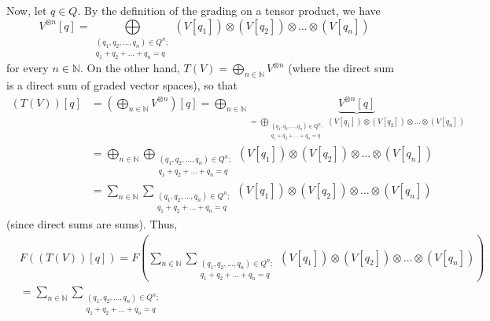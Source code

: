 \documentclass[etingof-lie.tex]{subfiles}
\begin{document}
\begin{verlong}
Now, let $q\in Q$. By the definition of the grading on a tensor product, we
have%
\[
V^{\otimes n}\left[  q\right]  =\bigoplus\limits_{\substack{\left(
q_{1},q_{2},...,q_{n}\right)  \in Q^{n};\\q_{1}+q_{2}+...+q_{n}=q}}\left(
V\left[  q_{1}\right]  \right)  \otimes\left(  V\left[  q_{2}\right]  \right)
\otimes...\otimes\left(  V\left[  q_{n}\right]  \right)
\]
for every $n\in\mathbb{N}$. On the other hand, $T\left(  V\right)
=\bigoplus\limits_{n\in\mathbb{N}}V^{\otimes n}$ (where the direct sum is a
direct sum of graded vector spaces), so that%
\begin{align*}
\left(  T\left(  V\right)  \right)  \left[  q\right]   &  =\left(
\bigoplus\limits_{n\in\mathbb{N}}V^{\otimes n}\right)  \left[  q\right]
=\bigoplus\limits_{n\in\mathbb{N}}\underbrace{V^{\otimes n}\left[  q\right]
}_{=\bigoplus\limits_{\substack{\left(  q_{1},q_{2},...,q_{n}\right)  \in
Q^{n};\\q_{1}+q_{2}+...+q_{n}=q}}\left(  V\left[  q_{1}\right]  \right)
\otimes\left(  V\left[  q_{2}\right]  \right)  \otimes...\otimes\left(
V\left[  q_{n}\right]  \right)  }\\
&  =\bigoplus\limits_{n\in\mathbb{N}}\bigoplus\limits_{\substack{\left(
q_{1},q_{2},...,q_{n}\right)  \in Q^{n};\\q_{1}+q_{2}+...+q_{n}=q}}\left(
V\left[  q_{1}\right]  \right)  \otimes\left(  V\left[  q_{2}\right]  \right)
\otimes...\otimes\left(  V\left[  q_{n}\right]  \right) \\
&  =\sum\limits_{n\in\mathbb{N}}\sum\limits_{\substack{\left(  q_{1}%
,q_{2},...,q_{n}\right)  \in Q^{n};\\q_{1}+q_{2}+...+q_{n}=q}}\left(  V\left[
q_{1}\right]  \right)  \otimes\left(  V\left[  q_{2}\right]  \right)
\otimes...\otimes\left(  V\left[  q_{n}\right]  \right)
\end{align*}
(since direct sums are sums). Thus,%
\begin{align*}
&  F\left(  \left(  T\left(  V\right)  \right)  \left[  q\right]  \right)
=F\left(  \sum\limits_{n\in\mathbb{N}}\sum\limits_{\substack{\left(
q_{1},q_{2},...,q_{n}\right)  \in Q^{n};\\q_{1}+q_{2}+...+q_{n}=q}}\left(
V\left[  q_{1}\right]  \right)  \otimes\left(  V\left[  q_{2}\right]  \right)
\otimes...\otimes\left(  V\left[  q_{n}\right]  \right)  \right) \\
&  =\sum\limits_{n\in\mathbb{N}}\sum\limits_{\substack{\left(  q_{1}%
,q_{2},...,q_{n}\right)  \in Q^{n};\\q_{1}+q_{2}+...+q_{n}=q}%
}
\end{align*}
\end{verlong}
\end{document}
